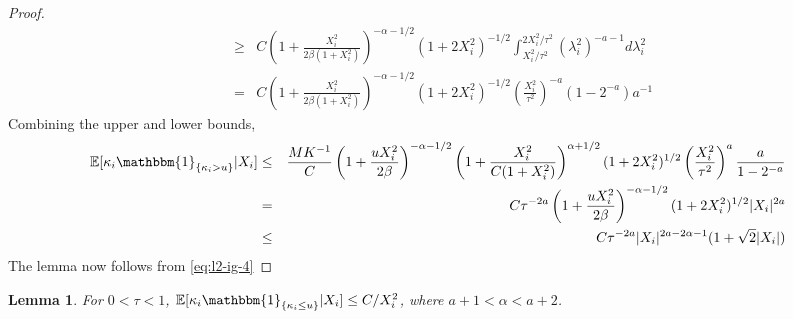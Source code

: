 \documentclass[sn-basic]{sn-jnl}%
\theoremstyle{thmstyleone}%
\newtheorem{lemma}{Lemma}[section]%
\begin{document}
\begin{proof}
\begin{eqnarray}
&\geq&
C \left(1+\frac{X_i^2}{2\beta(1+X_i^2)} \right)^{-\alpha-1/2} (1+2X_i^2)^{-1/2} \int_{X_i^2/\tau^2}^{2X_i^2/\tau^2} (\lambda_i^2)^{-a-1} d\lambda_i^2 \nonumber \\
&=&
C \left(1+\frac{X_i^2}{2\beta(1+X_i^2)} \right)^{-\alpha-1/2} (1+2X_i^2)^{-1/2} \left(\frac{X_i^2}{\tau^2}\right)^{-a} (1-2^{-a}) a^{-1}
\label{eq:l2-ig-3}
\end{eqnarray}
Combining the upper and lower bounds,
\begin{eqnarray}
\mathbb{E}[\kappa_i \mathbbm{1}_{\{ \kappa_i > u \}} | X_i]
&\leq&
\frac{M K^{-1}}{C} \left( 1+\frac{uX_i^2}{2\beta} \right)^{-\alpha-1/2} \left(1+\frac{X_i^2}{C(1+X_i^2)} \right)^{\alpha+1/2} (1+2X_i^2)^{1/2} \left(\frac{X_i^2}{\tau^2}\right)^{a} \frac{a}{1-2^{-a}} \nonumber \\
&=&
C\tau^{-2a} \left( 1+\frac{uX_i^2}{2\beta} \right)^{-\alpha-1/2} (1+2X_i^2)^{1/2} |X_i|^{2a} \nonumber \\
&\leq&
C\tau^{-2a} |X_i|^{2a - 2\alpha - 1} (1+\sqrt{2}|X_i|)
\label{eq:l2-ig-4}
\end{eqnarray}
\noindent
The lemma now follows from \eqref{eq:l2-ig-4}
\end{proof}


\begin{lemma}\label{lem:ig3}
For $0 < \tau < 1$, $\mathbb{E}[\kappa_i \mathbbm{1}_{\{ \kappa_i \leq u \}} | X_i] \leq C/X_i^2$, where $a+1<\alpha<a+2$.
\end{lemma}
\end{document}
